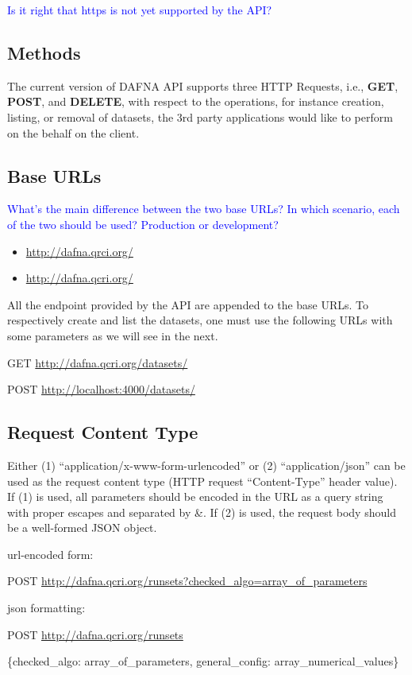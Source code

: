 \documentclass[a4paper,10pt]{scrartcl}
\newcommand{\lamine}[1]{\textcolor{blue}{#1}}
\begin{document}
\lamine{Is it right that https is not yet supported by the API?}
\subsection{Methods}
The current version of DAFNA API supports three HTTP Requests, i.e., \textbf{GET}, \textbf{POST}, and \textbf{DELETE}, 
with respect to the operations, for instance creation, listing, or removal of datasets, the 3rd party applications would
like to perform on the behalf on the client.
\subsection{Base URLs}
\lamine{What's the main difference between the two base URLs? In which scenario, each of the two should be used? Production or development?}
\begin{itemize}
 \item \href{http://dafna.qrci.org/}{http://dafna.qrci.org/}
 \item \href{http://dafna.qcri.org/}{http://dafna.qcri.org/}
\end{itemize}
All the endpoint provided by the API are appended to the base URLs.
To respectively create and list the datasets, one must use the following URLs with some parameters
as we will see in the next. 
\begin{description}
\item GET \href{http://dafna.qcri.org/datasets/}{http://dafna.qcri.org/datasets/} \\
 \item POST \href{http://dafna.qcri.org/datasets/}{http://localhost:4000/datasets/}
\end{description}
\subsection{Request Content Type}
Either (1) ``application/x-www-form-urlencoded” or (2) ``application/json” can be used as the request content type (HTTP request “Content-Type” header value). 
If (1) is used, all parameters should be encoded in the URL as a query string with proper escapes and separated by \&. If (2) is used, the request body should 
be a well-formed JSON object. 

\begin{description}
 \item url-encoded form:
 \item POST \href{http://localhost:4000/runsets?checked\_algo=array\_of\_parameters}{http://dafna.qcri.org/runsets?checked\_algo=array\_of\_parameters}
 \item json formatting:
 \item POST \href{http://localhost:4000/runsets}{http://dafna.qcri.org/runsets}
 \item \{checked\_algo: array\_of\_parameters, general\_config: array\_numerical\_values\}
\end{description}
\end{document}

